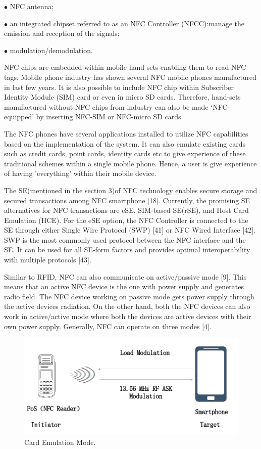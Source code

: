 \documentclass[journal]{IEEEtran}
\begin{document}
$\bullet$ NFC antenna;

$\bullet$ an integrated chipset referred to as an NFC Controller (NFCC):manage the emission and reception of the signals;


$\bullet$ modulation/demodulation.



NFC chips are embedded within mobile hand-sets enabling them to read NFC tags. Mobile phone industry has shown several NFC mobile phones manufactured in last few years. It is also possible to include NFC chip within Subscriber Identity Module (SIM) card or even in micro SD cards. Therefore, hand-sets manufactured without NFC chips from industry can also be made ‘NFC-equipped’ by inserting NFC-SIM or NFC-micro SD cards.

The NFC phones have several applications installed to utilize NFC capabilities based on the implementation of the system. It can also emulate existing cards such as credit cards, point cards, identity cards etc to give experience of these traditional schemes within a single mobile phone. Hence, a user is give experience of having 'everything' within their mobile device.

The SE(mentioned in the section 3)of NFC technology enables secure storage and secured transactions among NFC smartphone [18]. Currently, the promising SE alternatives for NFC transactions are eSE, SIM-based SE(rSE), and Host Card Emulation (HCE). For the eSE option, the NFC Controller is connected to the SE through either Single Wire Protocol (SWP) [41] or NFC Wired Interface  [42]. SWP is the most commonly used protocol between the NFC interface and the SE. It can be used for all SE-form factors and provides optimal interoperability with multiple protocols [43].

Similar to RFID, NFC can also communicate on active/passive mode [9]. This means that an active NFC device is the one with power supply and generates radio field. The NFC device working on passive mode gets power supply through the active devices radiation. On the other hand, both the NFC devices can also work in active/active mode where both the devices are active devices with their own power supply. Generally, NFC can operate on three modes [4].

\begin{figure}[htbp]
\centerline{\includegraphics[scale=0.25]{Card_Emulation_Mode.png}}
\caption{Card Emulation Mode.}
\label{fig}
\end{figure}
\end{document}
